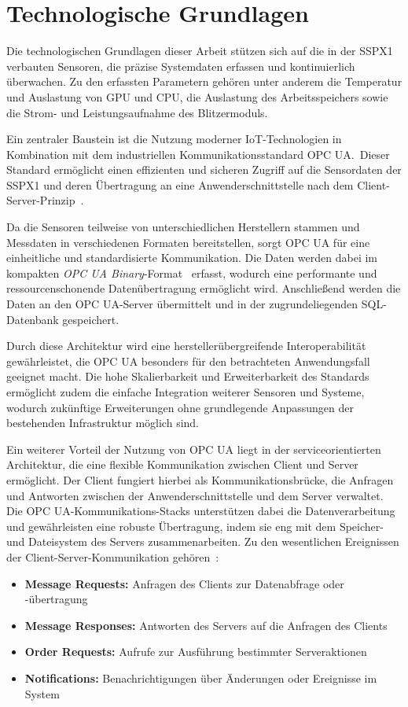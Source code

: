 \section{Technologische Grundlagen}\label{sec:technologische_grundlagen}
Die technologischen Grundlagen dieser Arbeit stützen sich auf die in der SSPX1 verbauten Sensoren, die präzise Systemdaten erfassen
und kontinuierlich überwachen. Zu den erfassten Parametern gehören unter anderem die Temperatur und Auslastung von GPU und CPU,
die Auslastung des Arbeitsspeichers sowie die Strom- und Leistungsaufnahme des Blitzermoduls.

Ein zentraler Baustein ist die Nutzung moderner IoT-Technologien in Kombination mit dem industriellen Kommunikationsstandard OPC UA.\
Dieser Standard ermöglicht einen effizienten und sicheren Zugriff auf die Sensordaten der SSPX1 und deren Übertragung an eine
Anwenderschnittstelle nach dem Client-Server-Prinzip~\cite{Babel2024}.

Da die Sensoren teilweise von unterschiedlichen Herstellern stammen und Messdaten in verschiedenen Formaten bereitstellen, sorgt OPC
UA für eine einheitliche und standardisierte Kommunikation. Die Daten werden dabei im kompakten \textit{OPC UA Binary}-Format~\cite{iec62541}
erfasst, wodurch eine performante und ressourcenschonende Datenübertragung ermöglicht wird. Anschließend werden die Daten an den OPC
UA-Server übermittelt und in der zugrundeliegenden SQL-Datenbank gespeichert. 

Durch diese Architektur wird eine herstellerübergreifende Interoperabilität gewährleistet, die OPC UA besonders für den betrachteten
Anwendungsfall geeignet macht. Die hohe Skalierbarkeit und Erweiterbarkeit des Standards ermöglicht zudem die einfache Integration
weiterer Sensoren und Systeme, wodurch zukünftige Erweiterungen ohne grundlegende Anpassungen der bestehenden Infrastruktur möglich
sind.

Ein weiterer Vorteil der Nutzung von OPC UA liegt in der serviceorientierten Architektur, die eine flexible Kommunikation
zwischen Client und Server ermöglicht. Der Client fungiert hierbei als Kommunikationsbrücke, die Anfragen und Antworten zwischen
der Anwenderschnittstelle und dem Server verwaltet. Die OPC UA-Kommunikations-Stacks unterstützen dabei die Datenverarbeitung und
gewährleisten eine robuste Übertragung, indem sie eng mit dem Speicher- und Dateisystem des Servers zusammenarbeiten. Zu den
wesentlichen Ereignissen der Client-Server-Kommunikation gehören~\cite{Babel2024,iec62541,Mao2024}:
\begin{itemize}
    \item \textbf{Message Requests:} Anfragen des Clients zur Datenabfrage oder -übertragung
    \item \textbf{Message Responses:} Antworten des Servers auf die Anfragen des Clients
    \item \textbf{Order Requests:} Aufrufe zur Ausführung bestimmter Serveraktionen
    \item \textbf{Notifications:} Benachrichtigungen über Änderungen oder Ereignisse im System
\end{itemize}

